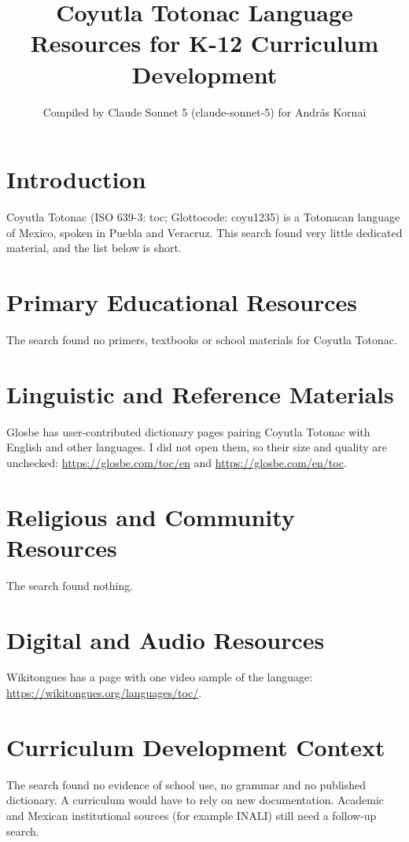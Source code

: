\documentclass[12pt]{article}
\title{Coyutla Totonac Language Resources for K-12 Curriculum Development}
\author{Compiled by Claude Sonnet 5 (claude-sonnet-5) for Andr\'as Kornai}
\date{}
\begin{document}
\maketitle

\section{Introduction}
Coyutla Totonac (ISO 639-3: toc; Glottocode: coyu1235) is a Totonacan language of Mexico, spoken in Puebla and Veracruz. This search found very little dedicated material, and the list below is short.

\section{Primary Educational Resources}
The search found no primers, textbooks or school materials for Coyutla Totonac.

\section{Linguistic and Reference Materials}
Glosbe has user-contributed dictionary pages pairing Coyutla Totonac with English and other languages. I did not open them, so their size and quality are unchecked: \url{https://glosbe.com/toc/en} and \url{https://glosbe.com/en/toc}.

\section{Religious and Community Resources}
The search found nothing.

\section{Digital and Audio Resources}
Wikitongues has a page with one video sample of the language: \url{https://wikitongues.org/languages/toc/}.

\section{Curriculum Development Context}
The search found no evidence of school use, no grammar and no published dictionary. A curriculum would have to rely on new documentation. Academic and Mexican institutional sources (for example INALI) still need a follow-up search.
\end{document}
